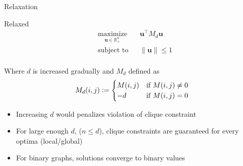 \documentclass{beamer}
\begin{document}
\begin{frame}{Relaxation}
  \vspace{1mm}

  \begin{block}{Relaxed}
    \begin{equation*}
      \begin{aligned}
         & \underset{\mathbf{u} \in \mathbb{R}_+^n}{\text{maximize}}
         &                                                           & \mathbf{u}^\top M_d \mathbf{u} \\
         & \text{subject to}
         &                                                           & \|\mathbf{u}\| \leq 1          \\
      \end{aligned}
    \end{equation*}
  \end{block}

  Where $d$ is increased gradually and $M_d$ defined as
  \begin{equation*}
    M_d(i,j) \vcentcolon= \begin{cases}
      M(i,j) & \text{if } M(i,j) \neq 0 \\
      -d     & \text{if } M(i,j) = 0
    \end{cases}
  \end{equation*}

  \begin{itemize}
    \item<2-> Increasing $d$ would penalizes violation of clique constraint
    \item<3-> For large enough $d$, ($n \leq d$), clique constraints are guaranteed for every optima (local/global)
    \item <4-> For binary graphs, solutions converge to binary values
  \end{itemize}
\end{frame}
\end{document}
